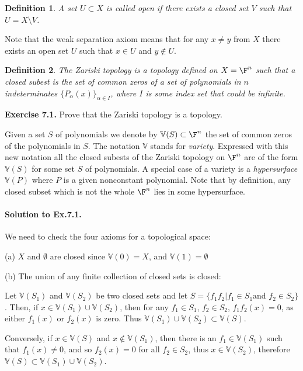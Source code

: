 \documentclass[11pt]{article}
\newcommand{\sk}{\vspace*{1em}}
\newtheorem{defn}{Definition}
\begin{document}
\begin{defn}
A set $U \subset X$  is called \emph{open} if there exists a closed set $V$ such that $U=X\setminus V$. 
\end{defn}

Note that the weak separation axiom means that for any $x\neq y$ from $X$ there exists an open set $U$ such that $x \in U$ and $y \not \in U$. 

\begin{defn}
The  \emph{Zariski topology} is a topology defined on $X={\F}^n$ such that a closed subest is the set of common zeros of a set of polynomials in $n$ indeterminates $\{P_{\alpha}(x)\}_{\alpha \in I}$, where $I$ is some index set that could be infinite. 
\end{defn} 




\sk\noindent
{\bf Exercise 7.1.} Prove that the Zariski topology is a topology. 

Given a set $S$ of polynomials we denote by $\mathbb{V}(S) \subset {\F}^n$ the set of common zeros of the polynomials in $S$. The notation $\mathbb{V}$ stands for \textit{variety}. Expressed with this new notation all the closed subests of the Zariski topology on ${\F}^n$ are of the form $\mathbb{V}(S)$ for some set $S$ of polynomials. A special case of a variety is a \textit{hypersurface} $\mathbb{V}(P)$ where $P$ is a given nonconstant polynomial. Note that by definition, any closed subset which is not the whole ${\F}^n$ lies in some hypersurface. 


\paragraph{Solution to Ex.7.1.} 

We need to check the four axioms for a topological space: 

(a) $X$ and $\emptyset$ are closed since  $\mathbb{V}(0)=X$, and  $\mathbb{V}(1)=\emptyset$

(b) The union of any finite collection of closed sets is closed: 

Let  $\mathbb{V}(S_1)$ and $\mathbb{V}(S_2)$ be two closed sets and let $S=\{f_1 f_2 | f_1 \in S_1 \text{and } f_2 \in S_2\}$. Then, if $x \in \mathbb{V}(S_1) \cup \mathbb{V}(S_2)$, then for any $f_1 \in S_1$, $f_2 \in S_2$, $f_1f_2(x)=0$, as either $f_1(x)$ or $f_2(x)$ is zero. Thus 
$\mathbb{V}(S_1) \cup \mathbb{V}(S_2) \subset \mathbb{V}(S)$. 

Conversely, if $x \in \mathbb{V}(S)$ and  $x \not \in \mathbb{V}(S_1)$, then 
there is an $f_1 \in \mathbb{V}(S_1)$ such that $f_1(x) \neq 0$, and so $f_2(x)=0$ for all $f_2 \in S_2$, thus $x \in \mathbb{V}(S_2)$, therefore
$\mathbb{V}(S) \subset \mathbb{V}(S_1) \cup \mathbb{V}(S_2)$. 
\end{document}
